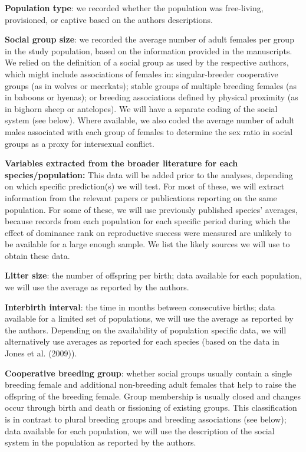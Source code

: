 \documentclass[]{article}
\begin{document}
\textbf{Population type}: we recorded whether the population was
free-living, provisioned, or captive based on the authors descriptions.

\textbf{Social group size}: we recorded the average number of adult
females per group in the study population, based on the information
provided in the manuscripts. We relied on the definition of a social
group as used by the respective authors, which might include
associations of females in: singular-breeder cooperative groups (as in
wolves or meerkats); stable groups of multiple breeding females (as in
baboons or hyenas); or breeding associations defined by physical
proximity (as in bighorn sheep or antelopes). We will have a separate
coding of the social system (see below). Where available, we also coded
the average number of adult males associated with each group of females
to determine the sex ratio in social groups as a proxy for intersexual
conflict.

\textbf{Variables extracted from the broader literature for each
species/population:} This data will be added prior to the analyses,
depending on which specific prediction(s) we will test. For most of
these, we will extract information from the relevant papers or
publications reporting on the same population. For some of these, we
will use previously published species' averages, because records from
each population for each specific period during which the effect of
dominance rank on reproductive success were measured are unlikely to be
available for a large enough sample. We list the likely sources we will
use to obtain these data.

\textbf{Litter size}: the number of offspring per birth; data available
for each population, we will use the average as reported by the authors.

\textbf{Interbirth interval}: the time in months between consecutive
births; data available for a limited set of populations, we will use the
average as reported by the authors. Depending on the availability of
population specific data, we will alternatively use averages as reported
for each species (based on the data in Jones et al. (2009)).

\textbf{Cooperative breeding group}: whether social groups usually
contain a single breeding female and additional non-breeding adult
females that help to raise the offspring of the breeding female. Group
membership is usually closed and changes occur through birth and death
or fissioning of existing groups. This classification is in contrast to
plural breeding groups and breeding associations (see below); data
available for each population, we will use the description of the social
system in the population as reported by the authors.
\end{document}

